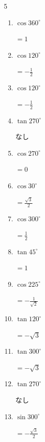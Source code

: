 \begin{multicols}{5}
\begin{enumerate}
  \item $\displaystyle \cos{360^\circ}$

        $\displaystyle =1$

  \item $\displaystyle \cos{120^\circ}$

        $\displaystyle =-\frac{1}{2}$

  \item $\displaystyle \cos{120^\circ}$

        $\displaystyle =-\frac{1}{2}$

  \item $\displaystyle \tan{270^\circ}$

        $\displaystyle なし$

  \item $\displaystyle \cos{270^\circ}$

        $\displaystyle =0$

  \item $\displaystyle \cos{30^\circ}$

        $\displaystyle =\frac{\sqrt{3}}{2}$

  \item $\displaystyle \cos{300^\circ}$

        $\displaystyle =\frac{1}{2}$

  \item $\displaystyle \tan{45^\circ}$

        $\displaystyle =1$

\columnbreak %

  \item $\displaystyle \cos{225^\circ}$

        $\displaystyle =-\frac{1}{\sqrt{2}}$

  \item $\displaystyle \tan{120^\circ}$

        $\displaystyle =-\sqrt{3}$

  \item $\displaystyle \tan{300^\circ}$

        $\displaystyle =-\sqrt{3}$

  \item $\displaystyle \tan{270^\circ}$

        $\displaystyle なし$

  \item $\displaystyle \sin{300^\circ}$

        $\displaystyle =-\frac{\sqrt{3}}{2}$


\end{enumerate}
\end{multicols}
